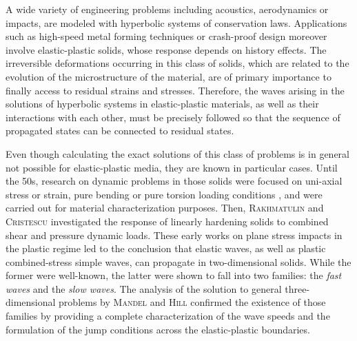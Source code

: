 A wide variety of engineering problems including acoustics, aerodynamics or impacts, are modeled with hyperbolic systems of conservation laws.
Applications such as high-speed metal forming techniques or crash-proof design moreover involve elastic-plastic solids, whose response depends on history effects.
The irreversible deformations occurring in this class of solids, which are related to the evolution of the microstructure of the material, are of primary importance to finally access to residual strains and stresses.
Therefore, the waves arising in the solutions of hyperbolic systems in elastic-plastic materials, as well as their interactions with each other, must be precisely followed so that the sequence of propagated states can be connected to residual states.


Even though calculating the exact solutions of this class of problems is in general not possible for elastic-plastic media, they are known in particular cases.
%
Until the 50s, research on dynamic problems in those solids were focused on uni-axial stress or strain, pure bending or pure torsion loading conditions \cite{Taylor,vonKarman}, and were carried out for material characterization purposes.
Then, \textsc{Rakhmatulin} \cite{Rakhmatulin} and \textsc{Cristescu} \cite{CRISTESCU19591605} investigated the response of linearly hardening solids to combined shear and pressure dynamic loads.
These early works on plane stress impacts in the plastic regime led to the conclusion that elastic waves, as well as plastic combined-stress simple waves, can propagate in two-dimensional solids. 
While the former were well-known, the latter were shown to fall into two families: the \textit{fast waves} and the \textit{slow waves}.
%
The analysis of the solution to general three-dimensional problems by \textsc{Mandel} \cite{Mandel62} and \textsc{Hill} \cite{Hill62} confirmed the existence of those families by providing a complete characterization of the wave speeds and the formulation of the jump conditions across the elastic-plastic boundaries.

